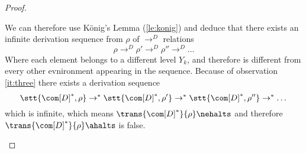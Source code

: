 \begin{proof}
\begin{itemize}
    We can therefore use König's Lemma (\ref{le:konig}) and deduce
    that there exists an infinite derivation sequence from \(\rho\) of \(\to^D\)
    relations
    \begin{equation*}
      \rho \to^D \rho' \to^D \rho'' \to^D \dots
    \end{equation*}
    Where each element belongs to a different level \(Y_k\), and
    therefore is different from every other evnironment appearing in
    the sequence. Because of observation \ref{it:three} there exists a
    derivation sequence
    \begin{equation*}
      \stt{\com[D]^*, \rho} \to^*\stt{\com[D]^*, \rho'} \to^* \stt{\com[D]^*, \rho''} \to^* \dots
    \end{equation*}
    which is infinite, which means \(\trans{\com[D]^*}{\rho}\nehalts\)
    and therefore \(\trans{\com[D]^*}{\rho} \ahalts\) is false.
    

\end{itemize}
\end{proof}
